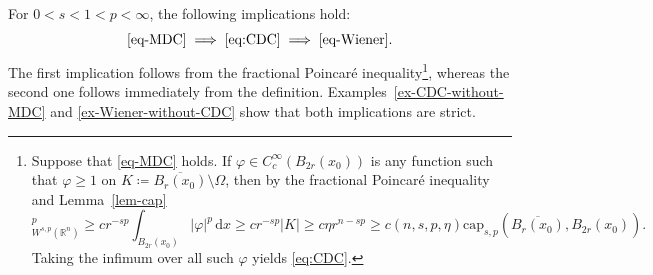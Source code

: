 \documentclass[11pt]{amsart}
\theoremstyle{plain}
\theoremstyle{definition}
\numberwithin{equation}{section}
\renewcommand{\d}{\,\mathrm{d}}
\begin{document}
For $0<s<1<p<\infty$, the following implications hold:
\begin{equation}\label{eq-hierarchy}
\eqref{eq-MDC} \implies \eqref{eq:CDC} \implies \eqref{eq-Wiener}.
\end{equation}
The first implication follows from the fractional Poincar\'e inequality\footnote{Suppose that \eqref{eq-MDC} holds. If $\varphi \in C^\infty_c(B_{2r}(x_0))$ is any function such that $\varphi \geq 1$ on $K \coloneqq \overline{B_r(x_0)} \setminus \Omega$, then by the fractional Poincar\'e inequality and Lemma~\ref{lem-cap}
\begin{equation*}
[\varphi]_{W^{s, p}(\mathbb{R}^n)}^p \geq c r^{-sp} \int_{B_{2r}(x_0)} |\varphi|^p \d x \geq cr^{-sp} |K| \geq c\eta r^{n-sp} \geq c(n, s, p, \eta) \mathrm{cap}_{s, p}(\overline{B_r(x_0)}, B_{2r}(x_0)).
\end{equation*}
Taking the infimum over all such $\varphi$ yields \eqref{eq:CDC}.}, whereas the second one follows immediately from the definition. Examples~\ref{ex-CDC-without-MDC} and \ref{ex-Wiener-without-CDC} show that both implications are strict.
\end{document}
